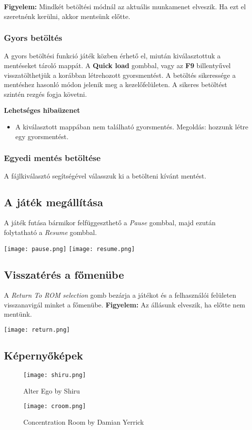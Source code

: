 \textbf{Figyelem:} Mindkét betöltési módnál az aktuális munkamenet elveszik. Ha ezt el szeretnénk kerülni, akkor mentsünk előtte.

\subsubsection{Gyors betöltés}

A gyors betöltési funkció játék közben érhető el, miután kiválasztottuk a mentéseket tároló mappát. A \textbf{Quick load} gombbal, vagy az \textbf{F9} billentyűvel visszatölthetjük a korábban létrehozott gyorsmentést.
A betöltés sikeressége a mentéshez hasonló módon jelenik meg a kezelőfelületen.
A sikeres betöltést szintén rezgés fogja követni.

\vspace{0.2cm}
\textbf{Lehetséges hibaüzenet}
\begin{itemize}
	\item A kiválasztott mappában nem található gyorsmentés.
	Megoldás: hozzunk létre egy gyorsmentést.
\end{itemize}

\subsubsection{Egyedi mentés betöltése}

A fájlkiválasztó segítségével válasszuk ki a betölteni kívánt mentést.

\subsection{A játék megállítása}

A játék futása bármikor felfüggeszthető a \emph{Pause} gombbal, majd ezután folytatható a \emph{Resume} gombbal.

\begin{center}
	\texttt{[image: pause.png]}
	\qquad
	\texttt{[image: resume.png]}
\end{center}

\subsection{Visszatérés a főmenübe}
A \emph{Return To ROM selection} gomb bezárja a játékot és a felhasználói felületen visszanavigál minket a főmenübe.
\newline \textbf{Figyelem:} Az állásunk elveszik, ha előtte nem mentünk. 
\vspace{0.3cm}
\begin{center}
	\texttt{[image: return.png]}
\end{center}

\subsection{Képernyőképek}
\vspace{0.5cm}
\begin{figure}[H]
	\centering
	\texttt{[image: shiru.png]}
	\caption{Alter Ego by Shiru}
	\vspace{1cm}
	\texttt{[image: croom.png]}
	\caption{Concentration Room by Damian Yerrick}
\end{figure}